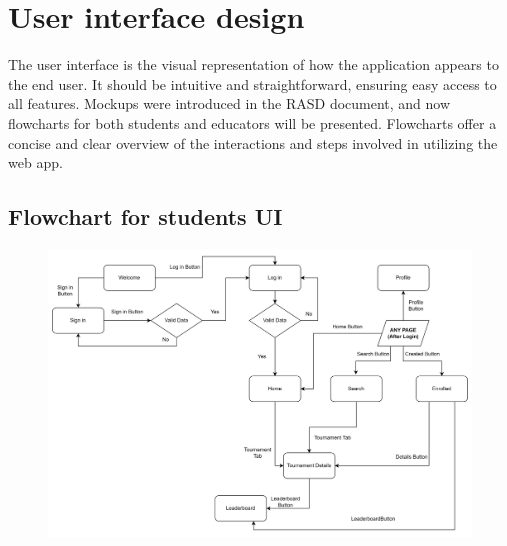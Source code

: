 \documentclass[12pt, a4paper]{report}
\begin{document}
\chapter{User interface design}
    The user interface is the visual representation of how the application appears to the end user.
    It should be intuitive and straightforward, ensuring easy access to all features.
    Mockups were introduced in the RASD document, and now flowcharts for both students and educators will be presented.
    Flowcharts offer a concise and clear overview of the interactions and steps involved in utilizing the web app.

    \section{Flowchart for students UI}
    \begin{figure}[H]
        \centering
        \includegraphics[width=0.9\linewidth]{images/students_UI.png}
    \end{figure}
\end{document}
